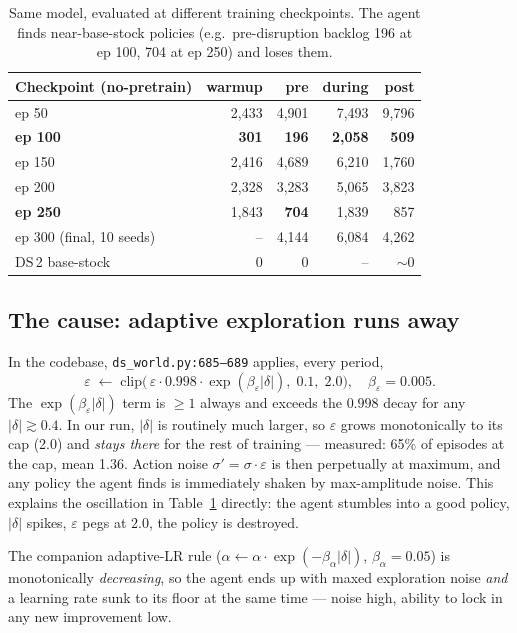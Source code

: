 \documentclass[11pt,letterpaper]{article}
\newcommand{\code}[1]{\texttt{\small #1}}
\begin{document}
\begin{table}[h!]\centering\small
\begin{tabular}{lrrrr}
\toprule
Checkpoint (no-pretrain) & warmup & \textbf{pre} & during & post \\
\midrule
ep 50  & 2{,}433 & 4{,}901 & 7{,}493 & 9{,}796 \\
\textbf{ep 100} & \textbf{301}   & \textbf{196}   & \textbf{2{,}058} & \textbf{509}   \\
ep 150 & 2{,}416 & 4{,}689 & 6{,}210 & 1{,}760 \\
ep 200 & 2{,}328 & 3{,}283 & 5{,}065 & 3{,}823 \\
\textbf{ep 250} & 1{,}843 & \textbf{704}   & 1{,}839 & 857   \\
ep 300 (final, 10 seeds) & -- & 4{,}144 & 6{,}084 & 4{,}262 \\
DS\,2 base-stock & 0 & 0 & -- & $\sim$0 \\
\bottomrule
\end{tabular}
\caption{Same model, evaluated at different training checkpoints.  The agent
finds near-base-stock policies (e.g.\ pre-disruption backlog 196 at ep 100, 704
at ep 250) and loses them.}
\label{tab:ckpts}
\end{table}

\subsection{The cause: adaptive exploration runs away}

In the codebase, \code{ds\_world.py:685--689} applies, every period,
\[
\varepsilon \;\leftarrow\; \mathrm{clip}\!\bigl(\,\varepsilon \cdot 0.998
\cdot \exp(\beta_\varepsilon \lvert\delta\rvert),\; 0.1,\; 2.0 \bigr),
\quad \beta_\varepsilon = 0.005.
\]
The $\exp(\beta_\varepsilon\lvert\delta\rvert)$ term is $\geq 1$ always and
exceeds the $0.998$ decay for any $\lvert\delta\rvert \gtrsim 0.4$.  In our
run, $\lvert\delta\rvert$ is routinely much larger, so $\varepsilon$ grows
monotonically to its cap (2.0) and \emph{stays there} for the rest of training
--- measured: 65\% of episodes at the cap, mean 1.36.  Action noise
$\sigma' = \sigma\cdot\varepsilon$ is then perpetually at maximum, and any
policy the agent finds is immediately shaken by max-amplitude noise.  This
explains the oscillation in Table~\ref{tab:ckpts} directly: the agent stumbles
into a good policy, $\lvert\delta\rvert$ spikes, $\varepsilon$ pegs at $2.0$,
the policy is destroyed.

The companion adaptive-LR rule
($\alpha \leftarrow \alpha\cdot\exp(-\beta_\alpha\lvert\delta\rvert)$,
$\beta_\alpha=0.05$) is monotonically \emph{decreasing}, so the agent ends up
with maxed exploration noise \emph{and} a learning rate sunk to its floor at
the same time --- noise high, ability to lock in any new improvement low.
\end{document}

